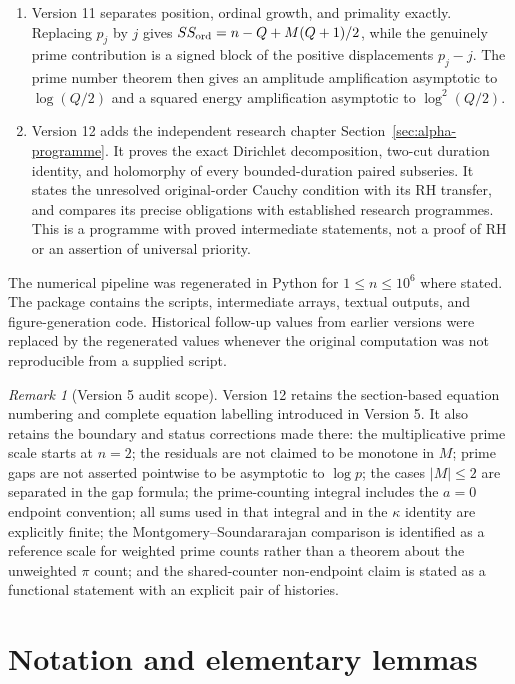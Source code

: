 \documentclass[11pt]{amsart}
\numberwithin{equation}{section}
\theoremstyle{plain}
\theoremstyle{definition}
\theoremstyle{remark}
\newtheorem{remark}[theorem]{Remark}
\begin{document}
\begin{enumerate}[label=(\roman*)]
levels, although an independent upper bound for $\mathcal A$ would still be
needed to deduce a new bound for $M$.
\item Version 11 separates position, ordinal growth, and primality exactly.
Replacing $p_j$ by $j$ gives
$SS_{\rm ord}=n-Q+M(Q+1)/2$, while the genuinely prime contribution is a
signed block of the positive displacements $p_j-j$.  The prime number theorem
then gives an amplitude amplification asymptotic to $\log(Q/2)$ and a squared
energy amplification asymptotic to $\log^2(Q/2)$.
\item Version 12 adds the independent research chapter
Section~\ref{sec:alpha-programme}. It proves the exact Dirichlet decomposition,
two-cut duration identity, and holomorphy of every bounded-duration paired
subseries. It states the unresolved original-order Cauchy condition with its
RH transfer, and compares its precise obligations with established research
programmes. This is a programme with proved intermediate statements, not a
proof of RH or an assertion of universal priority.
\end{enumerate}

The numerical pipeline was regenerated in Python for $1\le n\le10^{6}$ where
stated.  The package contains the scripts, intermediate arrays, textual outputs,
and figure-generation code.  Historical follow-up values from earlier versions
were replaced by the regenerated values whenever the original computation was
not reproducible from a supplied script.

\begin{remark}[Version 5 audit scope]
\label{rem:v5-audit}
Version 12 retains the section-based equation numbering and complete equation labelling
introduced in Version 5. It also retains the boundary and status corrections made there: the
multiplicative prime scale starts at $n=2$; the residuals are not claimed to be
monotone in $M$; prime gaps are not asserted pointwise to be asymptotic to
$\log p$; the cases $|M|\le2$ are separated in the gap formula; the
prime-counting integral includes the $a=0$ endpoint convention; all sums used
in that integral and in the $\kappa$ identity are explicitly finite; the
Montgomery--Soundararajan comparison is identified as a reference scale for
weighted prime counts rather than a theorem about the unweighted $\pi$ count;
and the shared-counter non-endpoint claim is stated as a functional statement
with an explicit pair of histories.
\end{remark}

\section{Notation and elementary lemmas}
\label{sec:notation}
\end{document}
